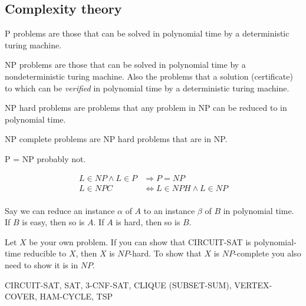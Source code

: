 \documentclass[10pt, a4paper,landscape]{article}
\begin{document}
\begin{multicols*}{4}
\subsection{Complexity theory}
\begin{compactitem}
    \item[P] problems are those that can be solved in polynomial time by a deterministic turing machine.
    \item[NP] problems are those that can be solved in polynomial time by a nondeterministic turing machine.
        Also the problems that a solution (certificate) to which can be \emph{verified} in polynomial time by a deterministic turing machine.
    \item[NP hard] problems are problems that any problem in NP can be reduced to in polynomial time.
    \item[NP complete] problems are NP hard problems that are in NP.
    \item[P = NP] probably not.
\end{compactitem}

\begin{align*}
L \in NP \wedge L \in P &\Rightarrow P = NP\\
L \in NPC &\Leftrightarrow L \in NPH \wedge L \in NP\\
\end{align*}

Say we can reduce an instance $\alpha$ of $A$ to an instance $\beta$ of $B$ in polynomial time. If $B$ is easy, then so is $A$. If $A$ is hard, then so is $B$.

Let $X$ be your own problem. If you can show that CIRCUIT-SAT is polynomial-time reducible to $X$, then $X$ is $NP$-hard. To show that $X$ is $NP$-complete you also need to show it is in $NP$.

CIRCUIT-SAT, SAT, 3-CNF-SAT, CLIQUE (SUBSET-SUM), VERTEX-COVER, HAM-CYCLE, TSP


\end{multicols*}
\end{document}
